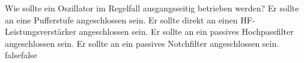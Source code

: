     {Wie sollte ein Oszillator im Regelfall ausgangsseitig betrieben werden?}
    {Er sollte an eine Pufferstufe angeschlossen sein.}
    {Er sollte direkt an einen HF-Leistungsverstärker angeschlossen sein.}
    {Er sollte an ein passives Hochpassfilter angeschlossen sein.}
    {Er sollte an ein passives Notchfilter angeschlossen sein.}
    {false}{false}